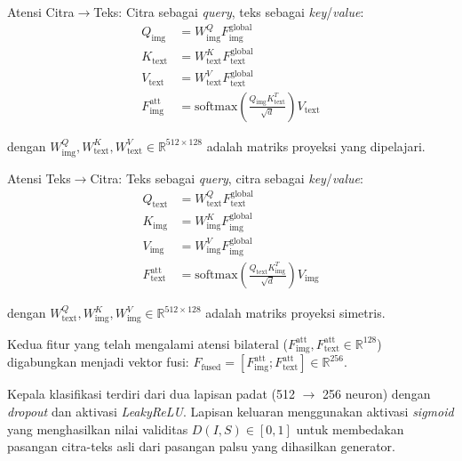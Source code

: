 Atensi Citra$\rightarrow$Teks: Citra sebagai \textit{query}, teks sebagai \textit{key}/\textit{value}:
\begin{align}
  Q_{\text{img}}              & = W_{\text{img}}^Q F_{\text{img}}^{\text{global}} \nonumber                                                    \\
  K_{\text{text}}             & = W_{\text{text}}^K F_{\text{text}}^{\text{global}} \nonumber                                                  \\
  V_{\text{text}}             & = W_{\text{text}}^V F_{\text{text}}^{\text{global}} \label{eq:IV.8}                                            \\
  F_{\text{img}}^{\text{att}} & = \text{softmax}\left(\frac{Q_{\text{img}} K_{\text{text}}^T}{\sqrt{d}}\right) V_{\text{text}} \label{eq:IV.9}
\end{align}

\noindent dengan $W_{\text{img}}^Q, W_{\text{text}}^K, W_{\text{text}}^V \in \mathbb{R}^{512 \times 128}$ adalah matriks proyeksi yang dipelajari.

Atensi Teks$\rightarrow$Citra: Teks sebagai \textit{query}, citra sebagai \textit{key}/\textit{value}:
\begin{align}
  Q_{\text{text}}              & = W_{\text{text}}^Q F_{\text{text}}^{\text{global}} \nonumber                                                  \\
  K_{\text{img}}               & = W_{\text{img}}^K F_{\text{img}}^{\text{global}} \nonumber                                                    \\
  V_{\text{img}}               & = W_{\text{img}}^V F_{\text{img}}^{\text{global}} \label{eq:IV.10}                                             \\
  F_{\text{text}}^{\text{att}} & = \text{softmax}\left(\frac{Q_{\text{text}} K_{\text{img}}^T}{\sqrt{d}}\right) V_{\text{img}} \label{eq:IV.11}
\end{align}

\noindent dengan $W_{\text{text}}^Q, W_{\text{img}}^K, W_{\text{img}}^V \in \mathbb{R}^{512 \times 128}$ adalah matriks proyeksi simetris.

Kedua fitur yang telah mengalami atensi bilateral ($F_{\text{img}}^{\text{att}}, F_{\text{text}}^{\text{att}} \in \mathbb{R}^{128}$) digabungkan menjadi vektor fusi: $F_{\text{fused}} = [F_{\text{img}}^{\text{att}}; F_{\text{text}}^{\text{att}}] \in \mathbb{R}^{256}$. 

Kepala klasifikasi terdiri dari dua lapisan padat (512 $\rightarrow$ 256 neuron) dengan \textit{dropout} dan aktivasi \textit{LeakyReLU}. Lapisan keluaran menggunakan aktivasi \textit{sigmoid} yang menghasilkan nilai validitas $D(I, S) \in [0, 1]$ untuk membedakan pasangan citra-teks asli dari pasangan palsu yang dihasilkan generator.


